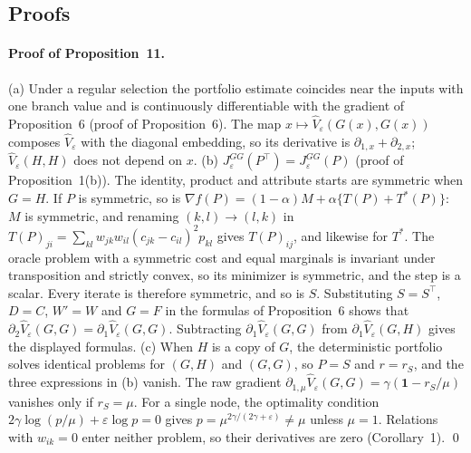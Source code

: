 \subsection{Proofs}

\paragraph{Proof of Proposition~11.}
(a) Under a regular selection the portfolio estimate coincides near the inputs with one branch value and is continuously differentiable with the gradient of Proposition~6 (proof of Proposition~6). The map $x\mapsto\widehat V_\varepsilon(G(x),G(x))$ composes $\widehat V_\varepsilon$ with the diagonal embedding, so its derivative is $\partial_{1,x}+\partial_{2,x}$; $\widehat V_\varepsilon(H,H)$ does not depend on $x$.
(b) $J^{GG}_\varepsilon(P^\top)=J^{GG}_\varepsilon(P)$ (proof of Proposition~1(b)). The identity, product and attribute starts are symmetric when $G=H$. If $P$ is symmetric, so is $\nabla f(P)=(1-\alpha)M+\alpha\{T(P)+T^\ast(P)\}$: $M$ is symmetric, and renaming $(k,l)\to(l,k)$ in $T(P)_{ji}=\sum_{kl}w_{jk}w_{il}(c_{jk}-c_{il})^2p_{kl}$ gives $T(P)_{ij}$, and likewise for $T^\ast$. The oracle problem with a symmetric cost and equal marginals is invariant under transposition and strictly convex, so its minimizer is symmetric, and the step is a scalar. Every iterate is therefore symmetric, and so is $S$. Substituting $S=S^\top$, $D=C$, $W'=W$ and $G=F$ in the formulas of Proposition~6 shows that $\partial_2\widehat V_\varepsilon(G,G)=\partial_1\widehat V_\varepsilon(G,G)$. Subtracting $\partial_1\widehat V_\varepsilon(G,G)$ from $\partial_1\widehat V_\varepsilon(G,H)$ gives the displayed formulas.
(c) When $H$ is a copy of $G$, the deterministic portfolio solves identical problems for $(G,H)$ and $(G,G)$, so $P=S$ and $r=r_S$, and the three expressions in (b) vanish. The raw gradient $\partial_{1,\mu}\widehat V_\varepsilon(G,G)=\gamma(\mathbf 1-r_S/\mu)$ vanishes only if $r_S=\mu$. For a single node, the optimality condition $2\gamma\log(p/\mu)+\varepsilon\log p=0$ gives $p=\mu^{2\gamma/(2\gamma+\varepsilon)}\neq\mu$ unless $\mu=1$. Relations with $w_{ik}=0$ enter neither problem, so their derivatives are zero (Corollary~1). \qed

